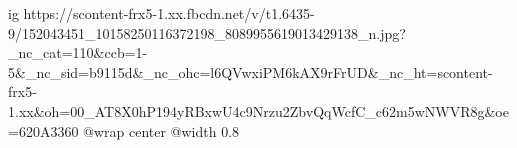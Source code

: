  
 
 
 
 

\ifcmt
  ig https://scontent-frx5-1.xx.fbcdn.net/v/t1.6435-9/152043451_10158250116372198_8089955619013429138_n.jpg?_nc_cat=110&ccb=1-5&_nc_sid=b9115d&_nc_ohc=l6QVwxiPM6kAX9rFrUD&_nc_ht=scontent-frx5-1.xx&oh=00_AT8X0hP194yRBxwU4c9Nrzu2ZbvQqWcfC_c62m5wNWVR8g&oe=620A3360
	@wrap center
	@width 0.8
\fi

